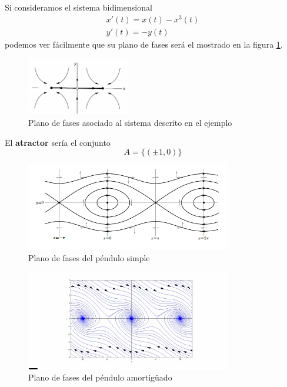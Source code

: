\documentclass[8pt]{beamer}
\begin{document}
\begin{frame}
\begin{example}
Si consideramos el sistema bidimensional
\[\begin{array}{l}
x'(t) = x(t)-x^3(t) \\
y'(t) = -y(t)
\end{array}\]
podemos ver fácilmente que su plano de fases será el mostrado en la figura \ref{fig:planoFasesAtractorEjemplo}.
\begin{figure}[H]
\centering
\includegraphics[width = 0.4\textwidth]{img/atractorExample.png}
\caption{Plano de fases asociado al sistema descrito en el ejemplo}
\label{fig:planoFasesAtractorEjemplo}
\end{figure}
El \textbf{atractor} sería el conjunto \[A=\{(\pm 1, 0)\}\]
\end{example}
\end{frame}
\begin{frame}
\begin{example}[El péndulo]
\begin{minipage}{0.48\textwidth}
\begin{center}
\begin{figure}[hbtp]
\centering
\includegraphics[width = 0.8\textwidth]{img/pend_simple.jpg}
\caption{Plano de fases del péndulo simple}
\end{figure}
\end{center}
\end{minipage}
\begin{minipage}{0.48\textwidth}
\begin{center}
\begin{figure}[hbtp]
\centering
\includegraphics[width = 0.8\textwidth]{img/pend_amort.jpg}
\caption{Plano de fases del péndulo amortigüado}
\end{figure}
\end{center}
\end{minipage}
\end{example}
\end{frame}
\end{document}
